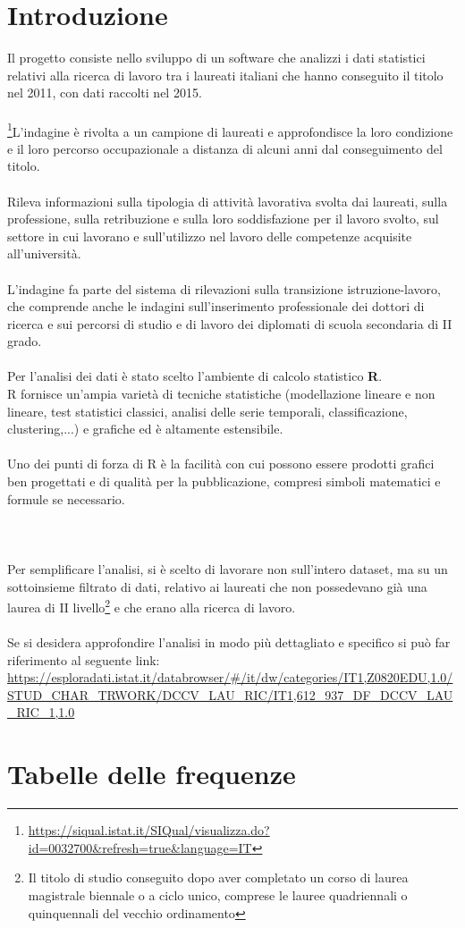 \documentclass[14pt, openany, titlepage]{report} %
\begin{document}
\chapter{Introduzione}
Il progetto consiste nello sviluppo di un software che analizzi i dati statistici relativi alla ricerca di lavoro tra i laureati italiani che hanno conseguito il titolo nel 2011, con dati raccolti nel 2015. \\\\
\footnote{\url{https://siqual.istat.it/SIQual/visualizza.do?id=0032700&refresh=true&language=IT}}L’indagine è rivolta a un campione di laureati e approfondisce la loro condizione e il loro percorso occupazionale a distanza di alcuni anni dal conseguimento del titolo. \\\\
Rileva informazioni sulla tipologia di attività lavorativa svolta dai laureati, sulla professione, sulla retribuzione e sulla loro soddisfazione per il lavoro svolto, sul settore in cui lavorano e sull'utilizzo nel lavoro delle competenze acquisite all'università.\\\\
L’indagine fa parte del sistema di rilevazioni sulla transizione istruzione-lavoro, che comprende anche le indagini sull'inserimento professionale dei dottori di ricerca e sui percorsi di studio e di lavoro dei diplomati di scuola secondaria di II grado.\\\\
\noindent
Per l'analisi dei dati è stato scelto l'ambiente di calcolo statistico \textbf{R}. \\
R fornisce un'ampia varietà di tecniche statistiche (modellazione lineare e non lineare, test statistici classici, analisi delle serie temporali, classificazione, clustering,...)
e grafiche ed è altamente estensibile.\\\\
\noindent
Uno dei punti di forza di R è la facilità con cui possono essere prodotti grafici ben progettati e di qualità per la pubblicazione, 
compresi simboli matematici e formule se necessario.\\\\\\\\
\noindent
Per semplificare l'analisi, si è scelto di lavorare non sull'intero dataset, 
ma su un sottoinsieme filtrato di dati, relativo ai laureati che non possedevano 
già una laurea di II livello\footnote{Il titolo di studio conseguito dopo aver completato un corso di 
laurea magistrale biennale o a ciclo unico, comprese le lauree quadriennali o quinquennali del vecchio ordinamento} 
e che erano alla ricerca di lavoro. \\\\
\noindent
Se si desidera approfondire l'analisi in modo più dettagliato e specifico si può far riferimento al seguente link: \url{https://esploradati.istat.it/databrowser/#/it/dw/categories/IT1,Z0820EDU,1.0/STUD_CHAR_TRWORK/DCCV_LAU_RIC/IT1,612_937_DF_DCCV_LAU_RIC_1,1.0}

\chapter{Tabelle delle frequenze}
\end{document}

